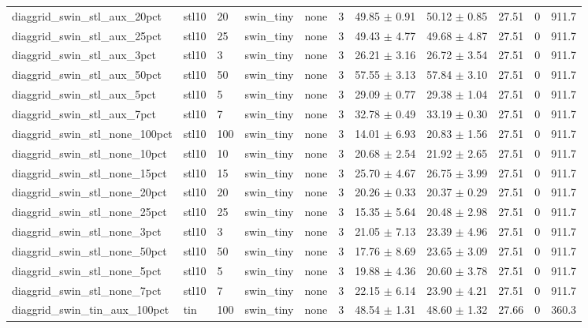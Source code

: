 \begin{tabular}{lllllllllll}
diaggrid_swin_stl_aux_20pct & stl10 & 20 & swin_tiny & none & 3 & 49.85 $\pm$ 0.91 & 50.12 $\pm$ 0.85 & 27.51 & 0 & 911.7 \\
diaggrid_swin_stl_aux_25pct & stl10 & 25 & swin_tiny & none & 3 & 49.43 $\pm$ 4.77 & 49.68 $\pm$ 4.87 & 27.51 & 0 & 911.7 \\
diaggrid_swin_stl_aux_3pct & stl10 & 3 & swin_tiny & none & 3 & 26.21 $\pm$ 3.16 & 26.72 $\pm$ 3.54 & 27.51 & 0 & 911.7 \\
diaggrid_swin_stl_aux_50pct & stl10 & 50 & swin_tiny & none & 3 & 57.55 $\pm$ 3.13 & 57.84 $\pm$ 3.10 & 27.51 & 0 & 911.7 \\
diaggrid_swin_stl_aux_5pct & stl10 & 5 & swin_tiny & none & 3 & 29.09 $\pm$ 0.77 & 29.38 $\pm$ 1.04 & 27.51 & 0 & 911.7 \\
diaggrid_swin_stl_aux_7pct & stl10 & 7 & swin_tiny & none & 3 & 32.78 $\pm$ 0.49 & 33.19 $\pm$ 0.30 & 27.51 & 0 & 911.7 \\
diaggrid_swin_stl_none_100pct & stl10 & 100 & swin_tiny & none & 3 & 14.01 $\pm$ 6.93 & 20.83 $\pm$ 1.56 & 27.51 & 0 & 911.7 \\
diaggrid_swin_stl_none_10pct & stl10 & 10 & swin_tiny & none & 3 & 20.68 $\pm$ 2.54 & 21.92 $\pm$ 2.65 & 27.51 & 0 & 911.7 \\
diaggrid_swin_stl_none_15pct & stl10 & 15 & swin_tiny & none & 3 & 25.70 $\pm$ 4.67 & 26.75 $\pm$ 3.99 & 27.51 & 0 & 911.7 \\
diaggrid_swin_stl_none_20pct & stl10 & 20 & swin_tiny & none & 3 & 20.26 $\pm$ 0.33 & 20.37 $\pm$ 0.29 & 27.51 & 0 & 911.7 \\
diaggrid_swin_stl_none_25pct & stl10 & 25 & swin_tiny & none & 3 & 15.35 $\pm$ 5.64 & 20.48 $\pm$ 2.98 & 27.51 & 0 & 911.7 \\
diaggrid_swin_stl_none_3pct & stl10 & 3 & swin_tiny & none & 3 & 21.05 $\pm$ 7.13 & 23.39 $\pm$ 4.96 & 27.51 & 0 & 911.7 \\
diaggrid_swin_stl_none_50pct & stl10 & 50 & swin_tiny & none & 3 & 17.76 $\pm$ 8.69 & 23.65 $\pm$ 3.09 & 27.51 & 0 & 911.7 \\
diaggrid_swin_stl_none_5pct & stl10 & 5 & swin_tiny & none & 3 & 19.88 $\pm$ 4.36 & 20.60 $\pm$ 3.78 & 27.51 & 0 & 911.7 \\
diaggrid_swin_stl_none_7pct & stl10 & 7 & swin_tiny & none & 3 & 22.15 $\pm$ 6.14 & 23.90 $\pm$ 4.21 & 27.51 & 0 & 911.7 \\
diaggrid_swin_tin_aux_100pct & tin & 100 & swin_tiny & none & 3 & 48.54 $\pm$ 1.31 & 48.60 $\pm$ 1.32 & 27.66 & 0 & 360.3 \\

\end{tabular}
